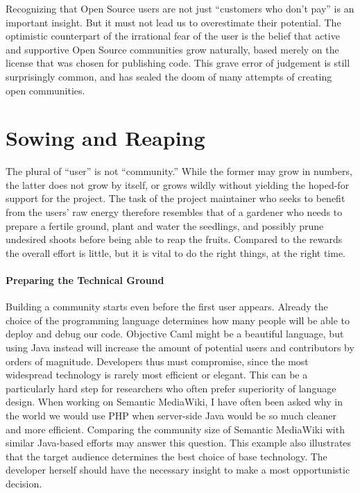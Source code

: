 Recognizing that Open Source users are not just ``customers who don't pay'' is
an important insight. But it must not lead us to overestimate their potential.
The optimistic counterpart of the irrational fear of the user is the belief that
active and supportive Open Source communities grow naturally, based merely on
the license that was chosen for publishing code. This grave error of judgement
is still surprisingly common, and has sealed the doom of many attempts of
creating open communities.

\section*{Sowing and Reaping}

The plural of ``user'' is not ``community.'' While the former may grow in
numbers, the latter does not grow by itself, or grows wildly without yielding
the hoped-for support for the project. The task of the project maintainer who
seeks to benefit from the users' raw energy therefore resembles that of a
gardener who needs to prepare a fertile ground, plant and water the seedlings,
and possibly prune undesired shoots before being able to reap the fruits.
Compared to the rewards the overall effort is little, but it is vital to do the
right things, at the right time.

\paragraph*{Preparing the Technical Ground}
Building a community starts even before the first user appears. Already the
choice of the programming language determines how many people will be able to
deploy and debug our code. Objective Caml might be a beautiful language, but
using Java instead will increase the amount of potential users and contributors
by orders of magnitude. Developers thus must compromise, since the most
widespread technology is rarely most efficient or elegant. This can be a
particularly hard step for researchers who often prefer superiority of language
design. When working on Semantic MediaWiki, I have often been asked why in the
world we would use PHP when server-side Java would be so much cleaner and more
efficient. Comparing the community size of Semantic MediaWiki with similar
Java-based efforts may answer this question. This example also illustrates that
the target audience determines the best choice of base technology. The developer
herself should have the necessary insight to make a most opportunistic decision.

